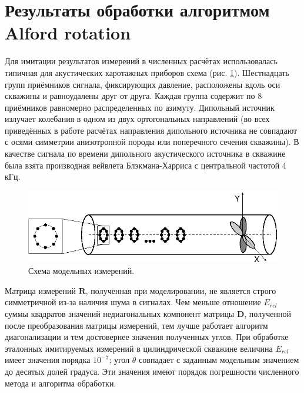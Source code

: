 \documentclass[a4paper,11pt]{article}
\begin{document}
\section{Результаты обработки алгоритмом Alford rotation}
\label{comparison_alford}
Для имитации результатов измерений в численных расчётах использовалась типичная для акустических каротажных приборов схема (рис. \ref{fig:measurement_scheme}). Шестнадцать групп приёмников сигнала, фиксирующих давление, расположены вдоль оси скважины и равноудалены друг от друга. Каждая группа содержит по 8 приёмников равномерно распределенных по азимуту. Дипольный источник излучает колебания в одном из двух ортогональных направлений (во всех приведённых в работе расчётах направления дипольного источника не совпадают с осями симметрии анизотропной породы или поперечного сечения скважины). В качестве сигнала по времени дипольного акустического источника в скважине была взята производная вейвлета Блэкмана-Харриса с центральной частотой 4 кГц. 

\begin{figure}[H]
	\includegraphics[width=1\linewidth]{./images/logging_tool_scheme.eps}
	\caption{\footnotesize Схема модельных измерений.}
	\label{fig:measurement_scheme}
\end{figure}

Матрица измерений $\mathbf{R}$, полученная при моделировании, не является строго симметричной из-за наличия шума в сигналах. Чем меньше отношение $E_{rel}$ суммы квадратов значений недиагональных компонент матрицы $\mathbf{D}$, полученной после преобразования матрицы измерений, тем лучше работает алгоритм диагонализации и тем достовернее значения полученных углов. При обработке эталонных имитируемых измерений в цилиндрической скважине величина $E_{rel}$ имеет значения порядка $10^{-7}$; угол $\theta$ совпадает с заданным модельным значением до десятых долей градуса. Эти значения имеют порядок погрешности численного метода и алгоритма обработки. 
\end{document}
